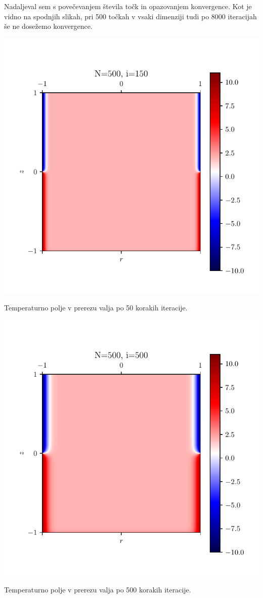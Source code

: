 Nadaljeval sem s povečevanjem števila točk in opazovanjem konvergence. Kot je vidno na spodnjih slikah, pri 500 točkah v vsaki dimenziji tudi po 8000 iteracijah še ne dosežemo konvergence.

\begin{center}
    \begin{minipage}{0.45\textwidth}
        \centering
    \includegraphics[width=\textwidth]{../old/2-valj-profili500_150.pdf}
    \caption{Temperaturno polje v prerezu valja po 50 korakih iteracije.}
    \end{minipage}\hfill
    \begin{minipage}{0.45\textwidth}
        \centering
    \includegraphics[width=\textwidth]{../old/2-valj-profili500_500.pdf}
    \caption{Temperaturno polje v prerezu valja po 500 korakih iteracije.}
    \end{minipage}


\end{center}
